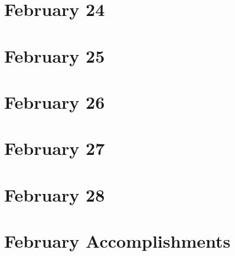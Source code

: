 \section{February 24}

\section{February 25}

\section{February 26}

\section{February 27}

\section{February 28}


\section{February Accomplishments}


